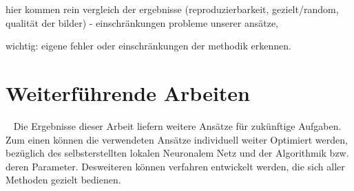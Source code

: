 hier kommen rein
vergleich der ergebnisse (reproduzierbarkeit, gezielt/random, qualität der bilder)
- einschränkungen probleme unserer ansätze, 


wichtig: eigene fehler oder einschränkungen der methodik erkennen.



\section{Weiterführende Arbeiten}~\newline 
Die Ergebnisse dieser Arbeit liefern weitere Ansätze für zukünftige Aufgaben. Zum einen können die verwendeten Ansätze individuell weiter Optimiert werden, bezüglich des selbsterstellten lokalen Neuronalem Netz und der Algorithmik bzw. deren Parameter. Desweiteren können verfahren entwickelt werden, die sich aller Methoden gezielt bedienen. 
